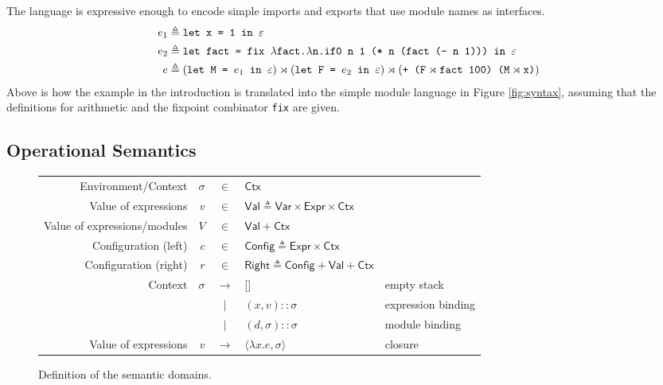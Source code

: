 \documentclass[acmsmall,screen,review]{acmart}\settopmatter{printfolios=true,printccs=false,printacmref=false}
\newcommand*{\vbar}{|}
\newcommand*{\cons}{::}
\newcommand*{\Expr}{\mathsf{Expr}}
\newcommand*{\ExprVar}{\mathsf{Var}}
\newcommand*{\modid}{d}
\newcommand*{\ctx}{\sigma}
\newcommand*{\Ctx}{\mathsf{Ctx}}
\newcommand*{\Value}{\mathsf{Val}}
\newcommand*{\Config}{\mathsf{Config}}
\newcommand*{\config}{c}
\newcommand*{\Right}{\mathsf{Right}}
\newcommand*{\rightst}{r}
\newcommand*{\synlink}{\rtimes}
\begin{document}
The language is expressive enough to encode simple imports and exports that use module names as interfaces.
\begin{align*}
  e_1 & \triangleq\text{\texttt{let x = 1 in }}\varepsilon                                                                                                                                                                                     \\
  e_2 & \triangleq\text{\texttt{let fact = fix }}\lambda\text{\texttt{fact.}}\lambda\text{\texttt{n.if0 n 1 (* n (fact (- n 1))) in }}\varepsilon                                                                                              \\
  e   & \triangleq(\text{\texttt{let M = }}e_1\text{\texttt{ in }}\varepsilon)\synlink(\text{\texttt{let F = }}e_2\text{\texttt{ in }}\varepsilon)\synlink(\text{\texttt{+ (F}}\synlink\text{\texttt{fact 100) (M}}\synlink\text{\texttt{x)}})
\end{align*}
Above is how the example in the introduction is translated into the simple module language in Figure \ref{fig:syntax}, assuming that the definitions for arithmetic and the fixpoint combinator \texttt{fix} are given.

\subsection{Operational Semantics}
\begin{figure}[h!]
  \footnotesize
  \centering
  \begin{tabular}{rrcll}
    Environment/Context          & $\ctx$     & $\in$         & $\Ctx$                                                                 \\
    Value of expressions         & $v$        & $\in$         & $\Value \triangleq \ExprVar\times\Expr\times\Ctx$                      \\
    Value of expressions/modules & $V$        & $\in$         & $\Value+\Ctx$                                                          \\
    Configuration (left)         & $\config$  & $\in$         & $\Config\triangleq\Expr\times\Ctx$                                     \\
    Configuration (right)        & $\rightst$ & $\in$         & $\Right\triangleq\Config+\Value+\Ctx$                                  \\
    Context                      & $\ctx$     & $\rightarrow$ & []                                                & empty stack        \\
                                 &            & $\vbar$       & $(x,v)\cons \ctx$                                 & expression binding \\
                                 &            & $\vbar$       & $(\modid,\ctx)\cons \ctx$                         & module binding     \\
    Value of expressions         & $v$        & $\rightarrow$ & $\langle \lambda x.e, \ctx \rangle$               & closure
  \end{tabular}
  \caption{Definition of the semantic domains.}
  \label{fig:simpdom}
\end{figure}
\end{document}

